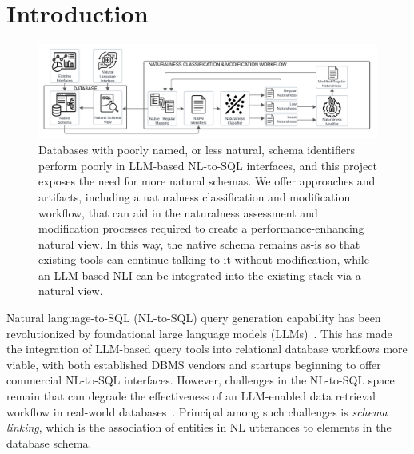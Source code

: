 \section{Introduction}


\begin{figure}
  \centering
  \includegraphics[width=\linewidth]{figures/Naturalness Pipeline - modification_workflow.pdf}
  \caption{Databases with poorly named, or less natural, schema identifiers perform poorly in LLM-based NL-to-SQL interfaces, and this project exposes the need for more natural schemas. We offer approaches and artifacts, including a naturalness classification and modification workflow, that can aid in the naturalness assessment and modification processes required to create a performance-enhancing natural view. In this way, the native schema remains as-is so that existing tools can continue talking to it without modification, while an LLM-based NLI can be integrated into the existing stack via a natural view.}
  \label{fig:artifact-map}
\end{figure}

Natural language-to-SQL (NL-to-SQL) query generation capability has been revolutionized by foundational large language models (LLMs)~\cite{openai-chatgpt-blog-post, roziere2023code, anil2023palm}.
This has made the integration of LLM-based query tools into relational database workflows more viable, with both established DBMS vendors and startups beginning to offer commercial NL-to-SQL interfaces.
However, challenges in the NL-to-SQL space remain that can degrade the effectiveness of an LLM-enabled data retrieval workflow in real-world databases~\cite{floratou2024nl2sql}.
Principal among such challenges is \emph{schema linking}, which is the association of entities in NL utterances to elements in the database schema.

